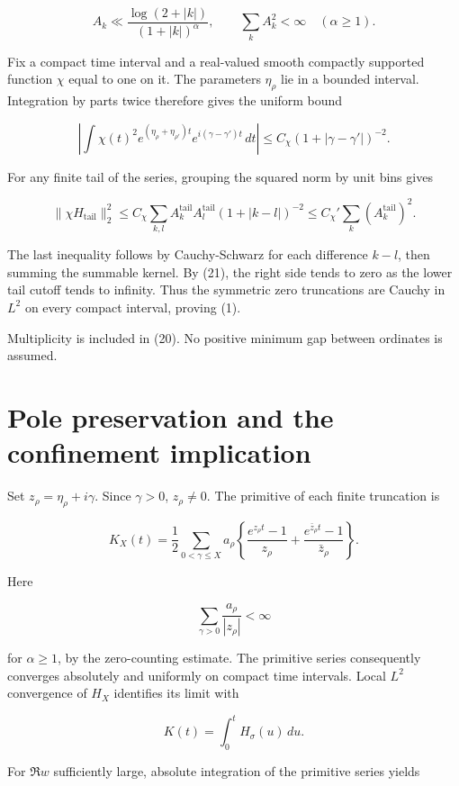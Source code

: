 \documentclass[
  11pt,
]{article}
\begin{document}
\[
A_k\ll \frac{\log(2+|k|)}{(1+|k|)^\alpha},
\qquad \sum_k A_k^2<\infty\quad(\alpha\ge1). \tag{21}
\]

Fix a compact time interval and a real-valued smooth compactly supported
function \(\chi\) equal to one on it. The parameters \(\eta_\rho\) lie
in a bounded interval. Integration by parts twice therefore gives the
uniform bound

\[
\left|\int \chi(t)^2 e^{(\eta_\rho+\eta_{\rho'})t}
e^{i(\gamma-\gamma')t}\,dt\right|
\le C_\chi(1+|\gamma-\gamma'|)^{-2}. \tag{22}
\]

For any finite tail of the series, grouping the squared norm by unit
bins gives

\[
\|\chi H_{\mathrm{tail}}\|_2^2
\le C_\chi\sum_{k,l}A_k^{\mathrm{tail}}A_l^{\mathrm{tail}}
(1+|k-l|)^{-2}
\le C_\chi'\sum_k(A_k^{\mathrm{tail}})^2. \tag{23}
\]

The last inequality follows by Cauchy-Schwarz for each difference
\(k-l\), then summing the summable kernel. By (21), the right side tends
to zero as the lower tail cutoff tends to infinity. Thus the symmetric
zero truncations are Cauchy in \(L^2\) on every compact interval,
proving (1).

Multiplicity is included in (20). No positive minimum gap between
ordinates is assumed.

\hypertarget{pole-preservation-and-the-confinement-implication}{%
\section{Pole preservation and the confinement
implication}\label{pole-preservation-and-the-confinement-implication}}

Set \(z_\rho=\eta_\rho+i\gamma\). Since \(\gamma>0\), \(z_\rho\ne0\).
The primitive of each finite truncation is

\[
K_X(t)=\frac12\sum_{0<\gamma\le X}a_\rho
\left\{\frac{e^{z_\rho t}-1}{z_\rho}
+\frac{e^{\bar z_\rho t}-1}{\bar z_\rho}\right\}.
\]

Here

\[
\sum_{\gamma>0}\frac{a_\rho}{|z_\rho|}<\infty \tag{24}
\]

for \(\alpha\ge1\), by the zero-counting estimate. The primitive series
consequently converges absolutely and uniformly on compact time
intervals. Local \(L^2\) convergence of \(H_X\) identifies its limit
with

\[
K(t)=\int_0^t H_\sigma(u)\,du. \tag{25}
\]

For \(\Re w\) sufficiently large, absolute integration of the primitive
series yields
\end{document}
